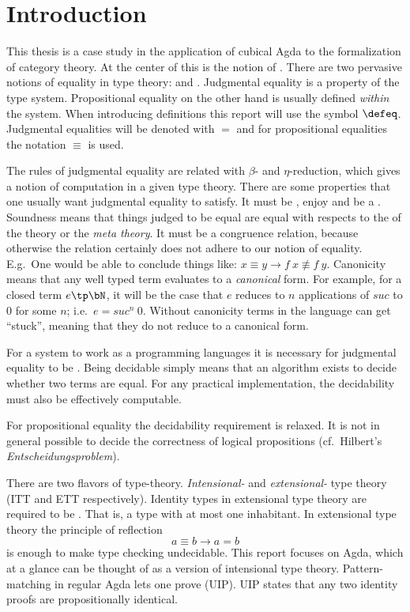 \chapter{Introduction}
This thesis is a case study in the application of cubical Agda to the
formalization of category theory. At the center of this is the notion
of . There are two pervasive notions of equality
in type theory:  and
. Judgmental equality is a property
of the type system.  Propositional equality on the other hand is
usually defined \emph{within} the system.  When introducing
definitions this report will use the symbol $\defeq$.  Judgmental
equalities will be denoted with $=$ and for propositional equalities
the notation $\equiv$ is used.

The rules of judgmental equality are related with $β$- and
$η$-reduction, which gives a notion of computation in a given type
theory.
%
There are some properties that one usually want judgmental equality to
satisfy. It must be , enjoy 
and be a . Soundness means that things
judged to be equal are equal with respects to the 
of the theory or the \emph{meta theory}. It must be a congruence
relation, because otherwise the relation certainly does not adhere to
our notion of equality. E.g.\ One would be able to conclude things
like: $x \equiv y \rightarrow f\ x \nequiv f\ y$. Canonicity means
that any well typed term evaluates to a \emph{canonical} form. For
example, for a closed term $e \tp \bN$, it will be the case that $e$
reduces to $n$ applications of $\mathit{suc}$ to $0$ for some $n$;
i.e.\ $e = \mathit{suc}^n\ 0$.  Without canonicity terms in the
language can get ``stuck'', meaning that they do not reduce to a
canonical form.

For a system to work as a programming languages it is necessary for
judgmental equality to be . Being decidable
simply means that an algorithm exists to decide whether two terms
are equal.  For any practical implementation, the decidability must
also be effectively computable.

For propositional equality the decidability requirement is relaxed. It
is not in general possible to decide the correctness of logical
propositions (cf.\ Hilbert's \emph{Entscheidungsproblem}).

There are two flavors of type-theory. \emph{Intensional-} and
\emph{extensional-} type theory (ITT and ETT respectively). Identity
types in extensional type theory are required to be
. That is, a type with at most one
inhabitant. In extensional type theory the principle of reflection
%
$$a ≡ b → a = b$$
%
is enough to make type checking undecidable. This report focuses on
Agda, which at a glance can be thought of as a version of intensional
type theory. Pattern-matching in regular Agda lets one prove
 (UIP). UIP states that any
two identity proofs are propositionally identical.

